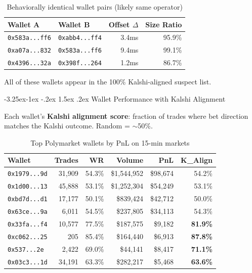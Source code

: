 \documentclass[11pt,a4paper]{article}
\makeatletter
\renewcommand\subsection{\@startsection{subsection}{2}{\z@}%
  {-3.25ex\@plus -1ex \@minus -.2ex}%
  {1.5ex \@plus .2ex}%
  {\normalfont\large\bfseries}}
\makeatother
\begin{document}
\begin{table}[H]
\centering
\caption{Behaviorally identical wallet pairs (likely same operator)}
\label{tab:fingerprint}
\small
\begin{tabular}{@{}llrr@{}}
\toprule
\textbf{Wallet A} & \textbf{Wallet B} & \textbf{Offset $\Delta$} & \textbf{Size Ratio} \\
\midrule
\texttt{0x583a...ff6} & \texttt{0xabb4...ff4} & 3.4ms & 95.9\% \\
\texttt{0xa07a...832} & \texttt{0x583a...ff6} & 9.4ms & 99.1\% \\
\texttt{0x4396...32a} & \texttt{0x398f...264} & 1.2ms & 86.7\% \\
\bottomrule
\end{tabular}
\end{table}

All of these wallets appear in the 100\% Kalshi-aligned suspect list.

\subsection{Wallet Performance with Kalshi Alignment}

Each wallet's \textbf{Kalshi alignment score}: fraction of trades where bet direction matches the Kalshi outcome. Random = $\sim$50\%.

\begin{table}[H]
\centering
\caption{Top Polymarket wallets by PnL on 15-min markets}
\label{tab:top_wallets_15m}
\small
\begin{tabular}{@{}lrrrrr@{}}
\toprule
\textbf{Wallet} & \textbf{Trades} & \textbf{WR} & \textbf{Volume} & \textbf{PnL} & \textbf{K\_Align} \\
\midrule
\texttt{0x1979...9d} & 31,909 & 54.3\% & \$1,544,952 & \$98,674 & 54.2\% \\
\texttt{0x1d00...13} & 45,888 & 53.1\% & \$1,252,304 & \$54,249 & 53.1\% \\
\texttt{0xbd7d...d1} & 17,177 & 50.1\% & \$839,424 & \$42,712 & 50.0\% \\
\texttt{0x63ce...9a} & 6,011 & 54.5\% & \$237,805 & \$34,113 & 54.3\% \\
\texttt{0x33fa...f4} & 10,577 & 77.5\% & \$187,575 & \$9,182 & \textbf{81.9\%} \\
\texttt{0xc062...25} & 205 & 85.4\% & \$164,440 & \$6,913 & \textbf{87.8\%} \\
\texttt{0x537...2e} & 2,422 & 69.0\% & \$44,141 & \$8,417 & \textbf{71.1\%} \\
\texttt{0x03c3...1d} & 34,191 & 63.3\% & \$282,217 & \$5,468 & \textbf{63.6\%} \\
\bottomrule
\end{tabular}
\end{table}
\end{document}
